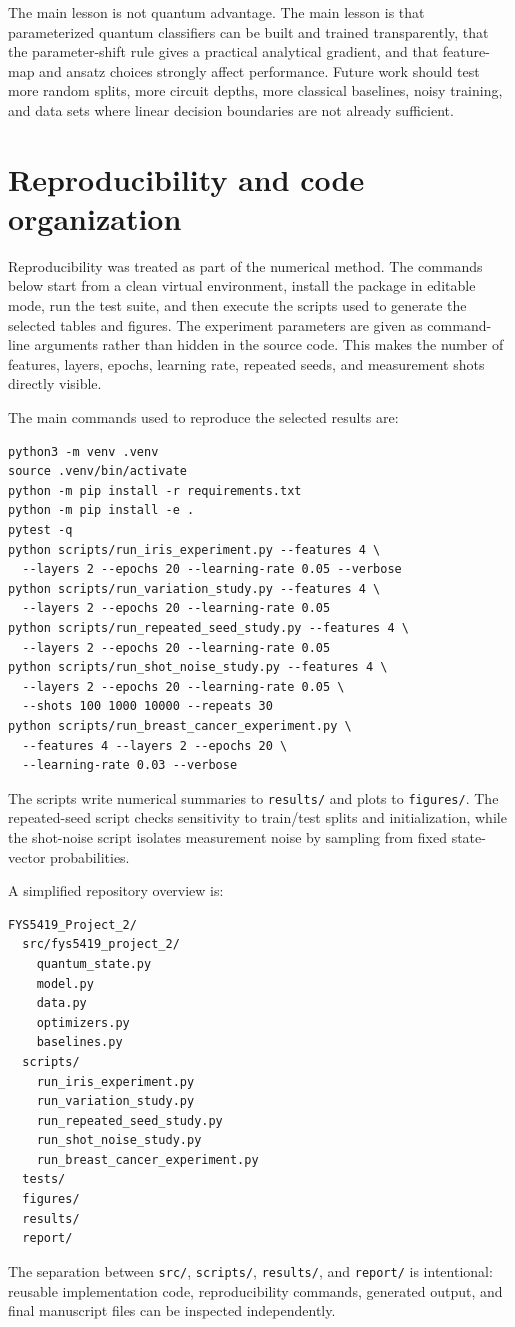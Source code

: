 \documentclass[10pt,a4paper]{article}
\newcommand{\code}[1]{\texttt{#1}}
\begin{document}
The main lesson is not quantum advantage. The main lesson is that parameterized quantum classifiers can be built and trained transparently, that the parameter-shift rule gives a practical analytical gradient, and that feature-map and ansatz choices strongly affect performance. Future work should test more random splits, more circuit depths, more classical baselines, noisy training, and data sets where linear decision boundaries are not already sufficient.

\appendix
\section{Reproducibility and code organization}
Reproducibility was treated as part of the numerical method. The commands below start from a clean virtual environment, install the package in editable mode, run the test suite, and then execute the scripts used to generate the selected tables and figures. The experiment parameters are given as command-line arguments rather than hidden in the source code. This makes the number of features, layers, epochs, learning rate, repeated seeds, and measurement shots directly visible.

The main commands used to reproduce the selected results are:
\begin{lstlisting}
python3 -m venv .venv
source .venv/bin/activate
python -m pip install -r requirements.txt
python -m pip install -e .
pytest -q
python scripts/run_iris_experiment.py --features 4 \
  --layers 2 --epochs 20 --learning-rate 0.05 --verbose
python scripts/run_variation_study.py --features 4 \
  --layers 2 --epochs 20 --learning-rate 0.05
python scripts/run_repeated_seed_study.py --features 4 \
  --layers 2 --epochs 20 --learning-rate 0.05
python scripts/run_shot_noise_study.py --features 4 \
  --layers 2 --epochs 20 --learning-rate 0.05 \
  --shots 100 1000 10000 --repeats 30
python scripts/run_breast_cancer_experiment.py \
  --features 4 --layers 2 --epochs 20 \
  --learning-rate 0.03 --verbose
\end{lstlisting}
The scripts write numerical summaries to \code{results/} and plots to \code{figures/}. The repeated-seed script checks sensitivity to train/test splits and initialization, while the shot-noise script isolates measurement noise by sampling from fixed state-vector probabilities.

\newpage
A simplified repository overview is:
\begin{lstlisting}
FYS5419_Project_2/
  src/fys5419_project_2/
    quantum_state.py
    model.py
    data.py
    optimizers.py
    baselines.py
  scripts/
    run_iris_experiment.py
    run_variation_study.py
    run_repeated_seed_study.py
    run_shot_noise_study.py
    run_breast_cancer_experiment.py
  tests/
  figures/
  results/
  report/
\end{lstlisting}
The separation between \code{src/}, \code{scripts/}, \code{results/}, and \code{report/} is intentional: reusable implementation code, reproducibility commands, generated output, and final manuscript files can be inspected independently.
\end{document}
